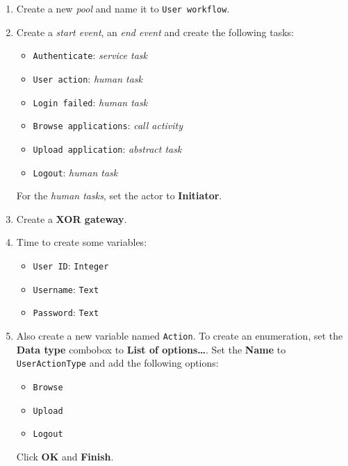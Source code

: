 \documentclass[]{report}
\begin{document}
\begin{enumerate}
\def\labelenumi{\arabic{enumi}.}
\item
  Create a new \emph{pool} and name it to \texttt{User workflow}.
\item
  Create a \emph{start event}, an \emph{end event} and create the
  following tasks:

  \begin{itemize}
  \itemsep1pt\parskip0pt
  \item
    \texttt{Authenticate}: \emph{service task}
  \item
    \texttt{User action}: \emph{human task}
  \item
    \texttt{Login failed}: \emph{human task}
  \item
    \texttt{Browse applications}: \emph{call activity}
  \item
    \texttt{Upload application}: \emph{abstract task}
  \item
    \texttt{Logout}: \emph{human task}
  \end{itemize}

  For the \emph{human tasks}, set the actor to \textbf{Initiator}.
\item
  Create a \textbf{XOR gateway}.
\item
  Time to create some variables:

  \begin{itemize}
  \itemsep1pt\parskip0pt
  \item
    \texttt{User ID}: \texttt{Integer}
  \item
    \texttt{Username}: \texttt{Text}
  \item
    \texttt{Password}: \texttt{Text}
  \end{itemize}
\item
  Also create a new variable named \texttt{Action}. To create an
  enumeration, set the \textbf{Data type} combobox to \textbf{List of
  options\ldots{}}. Set the \textbf{Name} to \texttt{UserActionType} and
  add the following options:

  \begin{itemize}
  \itemsep1pt\parskip0pt
  \item
    \texttt{Browse}
  \item
    \texttt{Upload}
  \item
    \texttt{Logout}
  \end{itemize}

  Click \textbf{OK} and \textbf{Finish}.


\end{enumerate}
\end{document}
